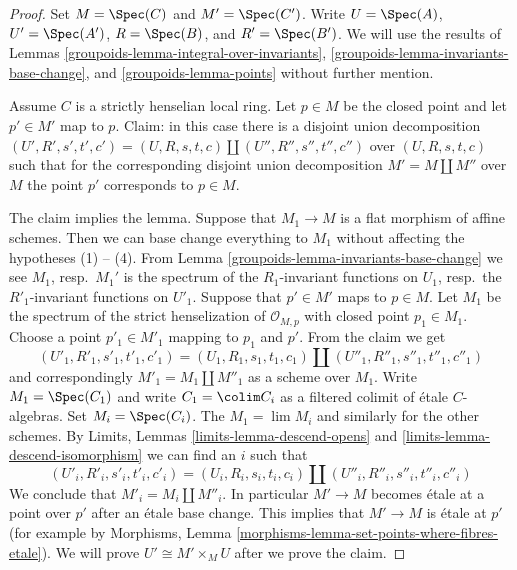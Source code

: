 \begin{proof}

Set $M = \Spec(C)$ and $M' = \Spec(C')$.
Write $U = \Spec(A)$, $U' = \Spec(A')$, $R = \Spec(B)$, and
$R' = \Spec(B')$. We will use the results of
Lemmas \ref{groupoids-lemma-integral-over-invariants},
\ref{groupoids-lemma-invariants-base-change}, and
\ref{groupoids-lemma-points}
without further mention.

\medskip\noindent
Assume $C$ is a strictly henselian local ring. Let $p \in M$
be the closed point and let $p' \in M'$ map to $p$.
Claim: in this case there is a disjoint union decomposition
$(U', R', s', t', c') = (U, R, s, t, c) \amalg (U'', R'', s'', t'', c'')$
over $(U, R, s, t, c)$ such that for the corresponding
disjoint union decomposition $M' = M \amalg M''$ over $M$
the point $p'$ corresponds to $p \in M$.

\medskip\noindent
The claim implies the lemma. Suppose that $M_1 \to M$ is a flat morphism
of affine schemes. Then we can base change everything to $M_1$
without affecting the hypotheses (1) -- (4).
From Lemma \ref{groupoids-lemma-invariants-base-change}
we see $M_1$, resp.\ $M_1'$ is the spectrum of the
$R_1$-invariant functions on $U_1$,
resp.\ the $R'_1$-invariant functions on $U'_1$.
Suppose that $p' \in M'$ maps to $p \in M$.
Let $M_1$ be the spectrum of the strict henselization of
$\mathcal{O}_{M, p}$ with closed point $p_1 \in M_1$.
Choose a point $p'_1 \in M'_1$ mapping to $p_1$ and $p'$.
From the claim we get
$$
(U'_1, R'_1, s'_1, t'_1, c'_1) =
(U_1, R_1, s_1, t_1, c_1) \amalg
(U''_1, R''_1, s''_1, t''_1, c''_1)
$$
and correspondingly $M'_1 = M_1 \amalg M''_1$ as a scheme over $M_1$.
Write $M_1 = \Spec(C_1)$ and write $C_1 = \colim C_i$ as a filtered
colimit of \'etale $C$-algebras. Set $M_i = \Spec(C_i)$.
The $M_1 = \lim M_i$ and similarly for the other schemes.
By Limits, Lemmas \ref{limits-lemma-descend-opens} and
\ref{limits-lemma-descend-isomorphism}
we can find an $i$ such that
$$
(U'_i, R'_i, s'_i, t'_i, c'_i) =
(U_i, R_i, s_i, t_i, c_i) \amalg
(U''_i, R''_i, s''_i, t''_i, c''_i)
$$
We conclude that $M'_i = M_i \amalg M''_i$. In particular
$M' \to M$ becomes \'etale at a point over $p'$ after an
\'etale base change. This implies that $M' \to M$ is \'etale at $p'$
(for example by Morphisms, Lemma
\ref{morphisms-lemma-set-points-where-fibres-etale}).
We will prove $U' \cong M' \times_M U$ after we prove the claim.


\end{proof}
